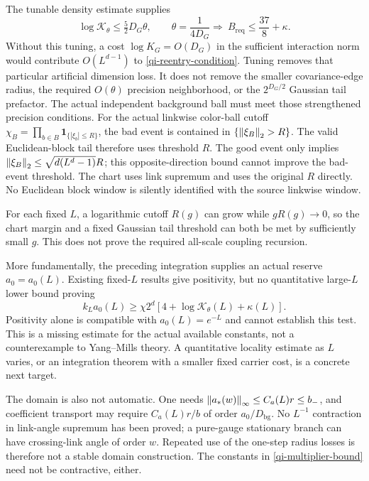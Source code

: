 The tunable density estimate supplies
\begin{equation}\label{qi-dimension-tuning}
 \log\mathcal K_\theta\le\tfrac52 D_G\theta,
 \qquad \theta=\frac1{4D_G} \Longrightarrow\
 B_{\mathrm{req}}\le\frac{37}{8}+\kappa.
\end{equation}
Without this tuning, a cost $\log K_G=O(D_G)$ in the
sufficient interaction norm would contribute $O(L^{d-1})$
to \eqref{qi-reentry-condition}. Tuning removes that
particular artificial dimension loss. It does not remove
the smaller covariance-edge radius, the required $O(\theta)$
precision neighborhood, or the $2^{D_G/2}$ Gaussian tail
prefactor. The actual independent background ball must meet
those strengthened precision conditions. For the actual
linkwise color-ball cutoff
$\chi_B=\prod_{b\in B}\mathbf1_{\{|\xi_b|\le R\}}$,
the bad event is contained in $\{\left\|\xi_B\right\|_2>R\}$.
The valid Euclidean-block tail therefore uses threshold $R$.
The good event only implies
$\left\|\xi_B\right\|_2\le\sqrt{d(L^d-1)}R$; this opposite-direction
bound cannot improve the bad-event threshold. The chart
uses link supremum and uses the original $R$ directly.
No Euclidean block window is silently identified with the
source linkwise window.

For each fixed $L$, a logarithmic cutoff $R(g)$ can grow while
$gR(g)\to0$, so the chart margin and a fixed Gaussian tail
threshold can both be met by sufficiently small $g$. This
does not prove the required all-scale coupling recursion.

More fundamentally, the preceding integration supplies an
actual reserve $a_0=a_0(L)$. Existing fixed-$L$ results give
positivity, but no quantitative large-$L$ lower bound proving
\begin{equation}\label{qi-open-L-test}
 k_L a_0(L)\ge
       \chi2^d[4+\log\mathcal K_\theta(L)+\kappa(L)].
\end{equation}
Positivity alone is compatible with $a_0(L)=e^{-L}$ and
cannot establish this test. This is a missing estimate for
the actual available constants, not a counterexample to
Yang--Mills theory. A quantitative locality estimate as $L$
varies, or an integration theorem with a smaller fixed
carrier cost, is a concrete next target.

The domain is also not automatic. One needs
$\left\|a_*(w)\right\|_\infty\le C_a(L)r\le b_-$, and coefficient
transport may require $C_a(L)r/b$ of order
$a_0/D_{\mathrm{bg}}$. No $L^{-1}$ contraction in link-angle
supremum has been proved; a pure-gauge stationary branch can
have crossing-link angle of order $w$. Repeated use of the
one-step radius losses is therefore not a stable domain
construction. The constants in \eqref{qi-multiplier-bound}
need not be contractive, either.

